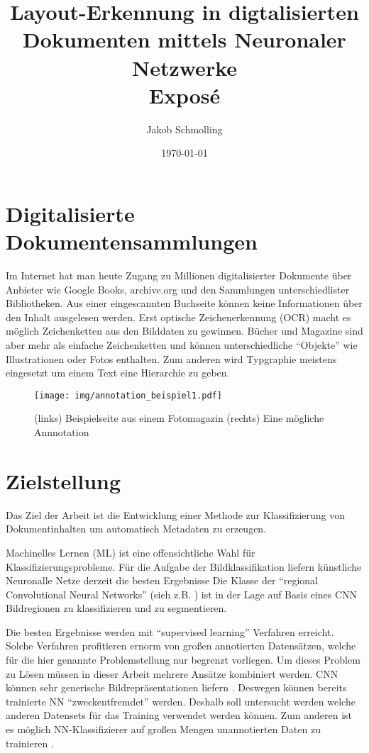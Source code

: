 \documentclass[nohyper,nobib]{tufte-handout}
\author{Jakob Schmolling}
\date{\today}
\title{
Layout-Erkennung in digtalisierten Dokumenten mittels Neuronaler Netzwerke\\
\small{Exposé}
}
\begin{document}
\maketitle

\section{Digitalisierte Dokumentensammlungen}
Im Internet hat man heute Zugang zu Millionen digitalisierter Dokumente über Anbieter wie Google Books, archive.org und den Sammlungen unterschiedlister Bibliotheken. 
Aus einer eingescannten Buchseite können keine Informationen über den Inhalt ausgelesen werden.
Erst optische Zeichenerkennung (OCR) macht es möglich Zeichenketten aus den Bilddaten zu gewinnen.
Bücher und Magazine sind aber mehr als einfache Zeichenketten und können unterschiedliche ``Objekte'' wie Illustrationen oder Fotos enthalten.
Zum anderen wird Typgraphie meistens eingesetzt um einem Text eine Hierarchie zu geben. 

\begin{figure}
\texttt{[image: img/annotation\_beispiel1.pdf]}
\caption{ (links) Beispielseite aus einem Fotomagazin \cite{__1967}
          (rechts) Eine mögliche Annnotation}
\end{figure}


\section{Zielstellung}
Das Ziel der Arbeit ist die Entwicklung einer Methode zur Klassifizierung von Dokumentinhalten um automatisch Metadaten zu erzeugen. 

Machinelles Lernen (ML) ist eine offensichtliche Wahl für Klassifizierungsprobleme. Für die Aufgabe der Bildklassifikation liefern künstliche Neuronalle Netze derzeit die besten Ergebnisse\cite{rodrigo_benenson_classification_2016}
Die Klasse der ``regional Convolutional Neural Networks'' (sieh z.B. \cite{girshick_region-based_2016}) ist in der Lage auf Basis eines CNN Bildregionen zu klassifizieren und zu segmentieren. 

Die besten Ergebnisse werden mit ``supervised learning'' Verfahren erreicht. 
Solche Verfahren profitieren ernorm von großen annotierten Datensätzen, welche 
für die hier genannte Problemstellung nur begrenzt vorliegen.
Um dieses Problem zu Lösen müssen in dieser Arbeit mehrere Ansätze kombiniert werden.
CNN können  sehr generische Bildrepräsentationen liefern \cite{razavian_cnn_2014}. 
Deswegen können bereits trainierte NN ``zweckentfremdet'' werden. Deshalb soll untersucht werden welche anderen Datensets für das Training verwendet werden können. 
Zum anderen ist es möglich NN-Klassifizierer auf großen Mengen unannotierten Daten zu trainieren \cite{le_building_2013}.
\end{document}
